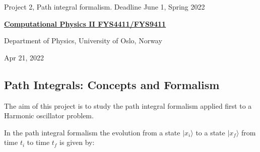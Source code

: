 \documentclass[%
oneside,                 %
final,                   %
10pt]{article}
\begin{document}

\newcommand{\exercisesection}[1]{\subsection*{#1}}






\thispagestyle{empty}

\begin{center}
{\LARGE\bf
\begin{spacing}{1.25}
Project 2, Path integral formalism. Deadline June 1, Spring 2022
\end{spacing}
}
\end{center}


\begin{center}
{\bf \href{{http://www.uio.no/studier/emner/matnat/fys/FYS4411/index-eng.html}}{Computational Physics II FYS4411/FYS9411}}
\end{center}

    \begin{center}
\centerline{{\small Department of Physics, University of Oslo, Norway}}
\end{center}
    

\begin{center}
Apr 21, 2022
\end{center}

\vspace{1cm}


\subsection{Path Integrals: Concepts and Formalism}

The aim of this project is to study the path integral formalism applied first to a Harmonic oscillator problem.

In the path integral formalism the evolution from a state $\vert x_i\rangle$
to a state $\vert  x_f\rangle$ from time $t_i$ to time $t_f$ is given by:
\end{document}
